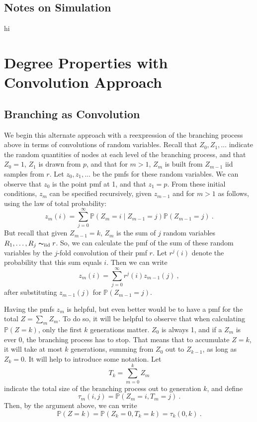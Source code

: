 \documentclass[12pt]{article}
\newcommand{\iid}{\mathrm{iid}}
\renewcommand{\P}{\mathbb{P}}
\begin{document}
\subsection{\textbf{\textsf{Notes on Simulation}}}

hi


\section{\textbf{\textsf{Degree Properties with Convolution Approach}}}

\subsection{\textbf{\textsf{Branching as Convolution}}}

We begin this alternate approach with a reexpression of the branching
process above in terms of convolutions of random variables. Recall that
$Z_0,Z_1,\dotsc$ indicate the random quantities of nodes at each level
of the branching process, and that $Z_0=1$, $Z_1$ is drawn from $p$,
and that for $m>1$, $Z_m$ is built from $Z_{m-1}$ iid samples from $r$.
Let $z_0,z_1,\dotsc$ be the pmfs for these random variables. We can
observe that $z_0$ is the point pmf at 1, and that $z_1 = p$. From these
initial conditions, $z_m$ can be specified recursively, given $z_{m-1}$
and for $m>1$ as follows, using the law of total probability:
\[
z_m(i) = \sum_{j=0}^\infty \P(Z_m=i\mid Z_{m-1}=j)\P(Z_{m-1}=j)\ .
\]
But recall that given $Z_{m-1}=k$, $Z_m$ is the sum of $j$
random variables $R_1,\dotsc,R_j \thicksim_\iid r$. So, we can calculate
the pmf of the sum of these random variables by the $j$-fold convolution
of their pmf $r$. Let $r^j(i)$ denote the probability that this sum equals
$i$. Then we can write
\[
z_m(i) = \sum_{j=0}^\infty r^j(i)z_{m-1}(j)\ ,
\]
after substituting $z_{m-1}(j)$ for $\P(Z_{m-1}=j)$.\par

Having the pmfs $z_m$ is helpful, but even better would be to have a pmf for
the total $Z=\sum_m Z_m$. To do so, it will be helpful to observe that
when calculating $\P(Z=k)$, only the first $k$ generations matter. $Z_0$
is always 1, and if a $Z_m$ is ever 0, the branching process has to stop.
That means that to accumulate $Z=k$, it will take at most $k$ generations,
summing from $Z_0$ out to $Z_{k-1}$, as long as $Z_k=0$. It will help to
introduce some notation. Let \[ T_k = \sum_{m=0}^{k} Z_m \] indicate the
total size of the branching process out to generation $k$, and define
\[ \tau_m(i, j) = \P(Z_m = i, T_m = j)\ .\] Then, by the argument above,
we can write \[ \P(Z = k) = \P(Z_k=0,T_k=k) = \tau_k(0,k)\ . \]\par
\end{document}
